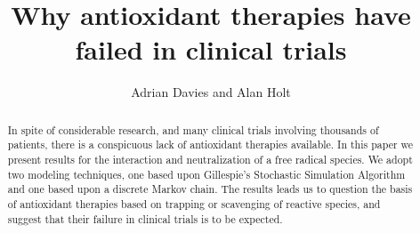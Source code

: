 \documentclass[preprint,12pt,authoryear]{elsarticle}
\begin{document}
 

\newcommand{\inquotes}[1] { ``{#1}''}

\begin{frontmatter}





\title{Why antioxidant therapies have failed in clinical trials}



\author{Adrian Davies and Alan Holt}

\address{}

\begin{abstract}

In spite of considerable research, and many clinical trials involving 
thousands of patients, there is a conspicuous lack of antioxidant 
therapies available. 
In this paper we present results for the interaction and neutralization of a free radical species.
We adopt two modeling techniques, one based upon Gillespie’s Stochastic Simulation Algorithm
and one based upon a  discrete Markov chain. 
The results leads us to 
question the basis of antioxidant therapies based on trapping or scavenging of reactive
species, and suggest that their failure in clinical trials is to be expected.

%
%
%
%
%


\end{abstract}
\end{frontmatter}
\end{document}

